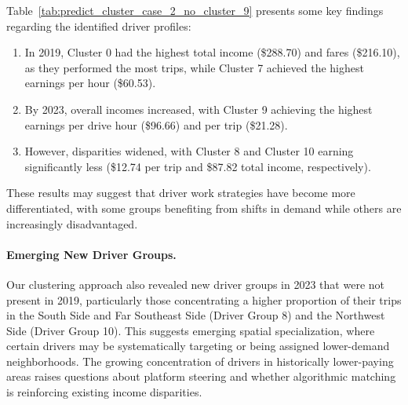 Table~\ref{tab:predict_cluster_case_2_no_cluster_9} presents some key findings regarding the identified driver profiles:

\begin{enumerate}
    \item In 2019, Cluster 0 had the highest total income (\$288.70) and fares (\$216.10), as they performed the most trips, while Cluster 7 achieved the highest earnings per hour (\$60.53).
    \item By 2023, overall incomes increased, with Cluster 9 achieving the highest earnings per drive hour (\$96.66) and per trip (\$21.28).
    \item However, disparities widened, with Cluster 8 and Cluster 10 earning significantly less (\$12.74 per trip and \$87.82 total income, respectively).
\end{enumerate}

These results may suggest that driver work strategies have become more differentiated, with some groups benefiting from shifts in demand while others are increasingly disadvantaged.


\paragraph{\textbf{Emerging New Driver Groups.}}

Our clustering approach also revealed new driver groups in 2023 that were not present in 2019, particularly those concentrating a higher proportion of their trips in the South Side and Far Southeast Side (Driver Group 8) and the Northwest Side (Driver Group 10). This suggests emerging spatial specialization, where certain drivers may be systematically targeting or being assigned lower-demand neighborhoods. The growing concentration of drivers in historically lower-paying areas raises questions about platform steering and whether algorithmic matching is reinforcing existing income disparities.



